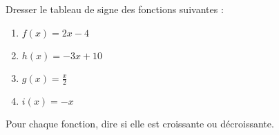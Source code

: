 
\begin{exercice}\label{exosmath-0001}

    Dresser le tableau de signe des fonctions suivantes :
    \begin{multicols}{2}
        \begin{enumerate}
            \item
                \( f(x)=2x-4\)
            \item
                \( h(x)=-3x+10\)
            \item
                \( g(x)=\frac{ x }{2}\)
            \item
                \( i(x)=-x\)
        \end{enumerate}
    \end{multicols}
    Pour chaque fonction, dire si elle est croissante ou décroissante.

\end{exercice}
